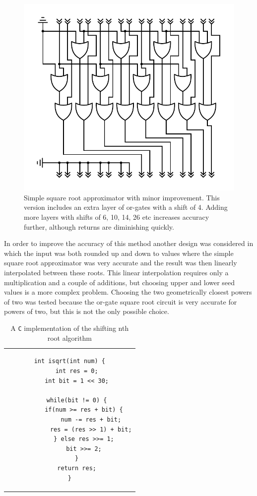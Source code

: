 			\begin{figure}
				\centering
				\caption{Simple square root approximator with minor improvement.
					This version includes an extra layer of or-gates with a 
					shift of 4. Adding more layers with shifts of 6, 10, 14, 26
					etc increases accuracy further, although returns are 
					diminishing quickly.}
				\label{orsqrt2}
				\includegraphics[width=0.75\linewidth]{figure/pdf/sqrt2Or.pdf} 
			\end{figure}

			In order to improve the accuracy of this method another design was
			considered in which the input was both rounded up and down to
			values where the simple square root approximator was very accurate
			and the result was then linearly interpolated between these roots.
			This linear interpolation requires only a multiplication and a
			couple of additions, but choosing upper and lower seed values is a
			more complex problem. Choosing the two geometrically closest powers
			of two was tested because the or-gate square root circuit is very
			accurate for powers of two, but this is not the only possible
			choice.

			\begin{table}
				\centering
				\caption{A \texttt{C} implementation of the shifting nth root 
					algorithm}
				\label{sqrtc}
				\begin{tabular}{c}
				\begin{lstlisting}
int isqrt(int num) {
    int res = 0;
    int bit = 1 << 30;

    while(bit != 0) {
        if(num >= res + bit) {
            num -= res + bit;
            res = (res >> 1) + bit;
        } else res >>= 1;
        bit >>= 2;
    }
    return res;
}
				\end{lstlisting}
				\end{tabular}
			\end{table}

